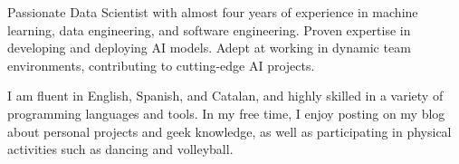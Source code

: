 

\begin{cvparagraph}


Passionate Data Scientist with almost four years of experience in machine
learning, data engineering, and software engineering. Proven expertise in
developing and deploying AI models. Adept at working in dynamic team
environments, contributing to cutting-edge AI projects.

I am fluent in English, Spanish, and Catalan, and highly skilled in a variety
of programming languages and tools. In my free time, I enjoy posting on my blog
about personal projects and geek knowledge, as well as participating in
physical activities such as dancing and volleyball.


\end{cvparagraph}
